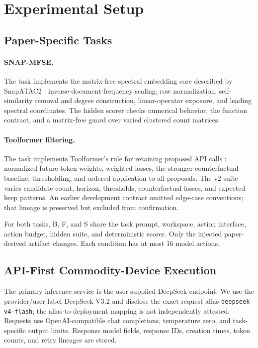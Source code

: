 \documentclass[letterpaper]{article} %
\begin{document}
\section{Experimental Setup}

\subsection{Paper-Specific Tasks}

\paragraph{SNAP-MFSE.}
The task implements the matrix-free spectral embedding core described by
SnapATAC2 \cite{zhang2024snapatac2}: inverse-document-frequency scaling, row
normalization, self-similarity removal and degree construction, linear-operator
exposure, and leading spectral coordinates.  The hidden scorer checks numerical
behavior, the function contract, and a matrix-free guard over varied clustered
count matrices.

\paragraph{Toolformer filtering.}
The task implements Toolformer's rule for retaining proposed API calls
\cite{schick2023toolformer}: normalized future-token weights, weighted losses,
the stronger counterfactual baseline, thresholding, and ordered application to
all proposals.  The v2 suite varies candidate count, horizon, thresholds,
counterfactual losses, and expected keep patterns.  An earlier development
contract omitted edge-case conventions; that lineage is preserved but excluded
from confirmation.

For both tasks, B, F, and S share the task prompt, workspace, action interface,
action budget, hidden suite, and deterministic scorer.  Only the injected
paper-derived artifact changes.  Each condition has at most 16 model actions.

\subsection{API-First Commodity-Device Execution}

The primary inference service is the user-supplied DeepSeek endpoint.  We use
the provider/user label DeepSeek V3.2 and disclose the exact request alias
\texttt{deepseek-v4-flash}; the alias-to-deployment mapping is not independently
attested.  Requests use OpenAI-compatible chat completions, temperature zero,
and task-specific output limits.  Response model fields, response IDs, creation
times, token counts, and retry lineages are stored.
\end{document}
